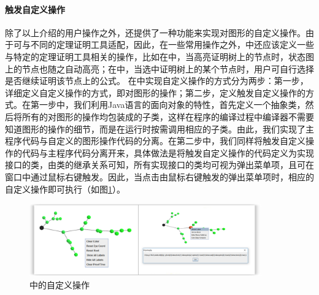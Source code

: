 \paragraph{触发自定义操作}
除了以上介绍的用户操作之外，还提供了一种功能来实现对图形的自定义操作。由于可与不同的定理证明工具适配，因此，在一些常用操作之外，中还应该定义一些与特定的定理证明工具相关的操作，比如在\sctlprov{}中，当高亮证明树上的节点时，状态图上的节点也随之自动高亮；在中，当选中证明树上的某个节点时，用户可自行选择是否继续证明该节点上的公式。
在中实现自定义操作的方式分为两步：第一步，详细定义自定义操作的方式，即对图形的操作；第二步，定义触发自定义操作的方式。在第一步中，我们利用Java语言的面向对象的特性，首先定义一个抽象类，然后将所有的对图形的操作均包装成的子类，这样在程序的编译过程中编译器不需要知道图形的操作的细节，而是在运行时按需调用相应的子类。由此，我们实现了主程序代码与自定义的图形操作代码的分离。在第二步中，我们同样将触发自定义操作的代码与主程序代码分离开来，具体做法是将触发自定义操作的代码定义为实现接口的类，由类的继承关系可知，所有实现接口的类均可视为弹出菜单项，且可在窗口中通过鼠标右键触发。因此，当点击由鼠标右键触发的弹出菜单项时，相应的自定义操作即可执行（如图\ref{vmdv:prooftree:userdefined}）。
\begin{figure}[h!]
	\centering
	\includegraphics[width=10cm]{Img/user_defined_operation}
	\caption{中的自定义操作}
	\label{vmdv:prooftree:userdefined}
\end{figure}
